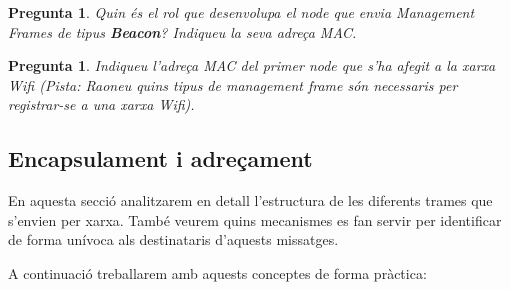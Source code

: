 \documentclass[12pt,a4paper]{article}
\newcounter{exercises}
\newtheorem{exer}[exercises]{Pregunta}
\begin{document}
\begin{enumerate}
\begin{exer} Quin és el rol que desenvolupa el node que envia Management Frames de tipus \textbf{Beacon}? Indiqueu la seva adreça MAC.\end{exer}

\begin{exer} Indiqueu l'adreça MAC del primer node que s'ha afegit a la xarxa Wifi (Pista: Raoneu quins tipus de management frame són necessaris per registrar-se a una xarxa Wifi). \end{exer}


\end{enumerate}

\subsection{Encapsulament i adreçament}
En aquesta secció analitzarem en detall l'estructura de les diferents trames que s'envien per xarxa. També veurem quins mecanismes es fan servir per identificar de forma unívoca als destinataris d'aquests missatges.

A continuació treballarem amb aquests conceptes de forma pràctica:
\end{document}
